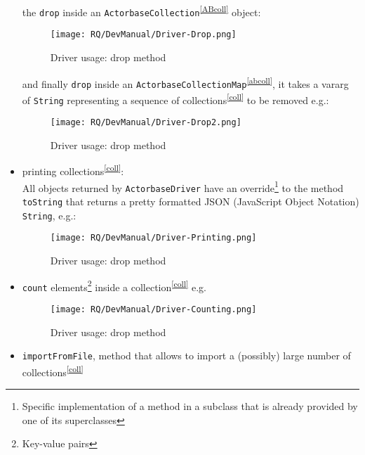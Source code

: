 \documentclass{scalatekids-article}
\begin{document}
\begin{itemize}
\begin{figure}[H]
   \end{figure}
  the \verb=drop= inside an \verb=ActorbaseCollection=\textsuperscript{\ref{ABcoll}} object:
   \begin{figure}[H]
     \begin{center}
       \texttt{[image: RQ/DevManual/Driver-Drop.png]}
       \caption{Driver usage: drop method}
     \end{center}
   \end{figure}
  and finally \verb=drop= inside an \verb=ActorbaseCollectionMap=\textsuperscript{\ref{abcoll}}, it takes a
  vararg of \verb=String= representing a sequence of collections\textsuperscript{\ref{coll}} to be removed
  e.g.:
   \begin{figure}[H]
     \begin{center}
       \texttt{[image: RQ/DevManual/Driver-Drop2.png]}
       \caption{Driver usage: drop method}
     \end{center}
   \end{figure}
\item printing collections\textsuperscript{\ref{coll}}:\\All objects returned by \verb=ActorbaseDriver=
  have an override\footnote{Specific implementation of a method in a subclass that
    is already provided by one of its superclasses} to the method \verb=toString=
  that returns a pretty formatted JSON (JavaScript Object Notation) \verb=String=, e.g.:
   \begin{figure}[H]
     \begin{center}
       \texttt{[image: RQ/DevManual/Driver-Printing.png]}
       \caption{Driver usage: drop method}
     \end{center}
   \end{figure}
\item \verb=count= elements\footnote{Key-value pairs} inside a collection\textsuperscript{\ref{coll}} e.g.
   \begin{figure}[H]
     \begin{center}
       \texttt{[image: RQ/DevManual/Driver-Counting.png]}
       \caption{Driver usage: drop method}
    \end{center}
   \end{figure}
\item \verb=importFromFile=, method that allows to import a (possibly) large number of collections\textsuperscript{\ref{coll}}

\end{itemize}
\end{document}
